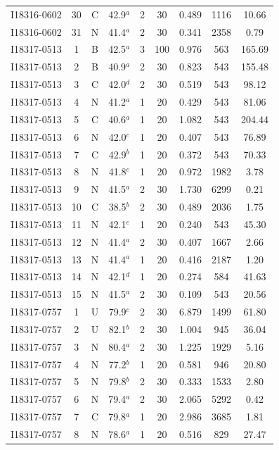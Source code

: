\begin{table}
\begin{tabular}{ccccccccc}
I18316-0602 & 30 & C & 42.9$^{a}$ & 2 & 30 & 0.489 & 1116 & 10.66 \\
I18316-0602 & 31 & N & 41.4$^{a}$ & 2 & 30 & 0.341 & 2358 & 0.79 \\
I18317-0513 & 1 & B & 42.5$^{a}$ & 3 & 100 & 0.976 & 563 & 165.69 \\
I18317-0513 & 2 & B & 40.9$^{a}$ & 2 & 30 & 0.823 & 543 & 155.48 \\
I18317-0513 & 3 & C & 42.0$^{d}$ & 2 & 30 & 0.519 & 543 & 98.12 \\
I18317-0513 & 4 & N & 41.2$^{a}$ & 1 & 20 & 0.429 & 543 & 81.06 \\
I18317-0513 & 5 & C & 40.6$^{a}$ & 1 & 20 & 1.082 & 543 & 204.44 \\
I18317-0513 & 6 & N & 42.0$^{c}$ & 1 & 20 & 0.407 & 543 & 76.89 \\
I18317-0513 & 7 & C & 42.9$^{b}$ & 1 & 20 & 0.372 & 543 & 70.33 \\
I18317-0513 & 8 & N & 41.8$^{c}$ & 1 & 20 & 0.972 & 1982 & 3.78 \\
I18317-0513 & 9 & N & 41.5$^{a}$ & 2 & 30 & 1.730 & 6299 & 0.21 \\
I18317-0513 & 10 & C & 38.5$^{b}$ & 2 & 30 & 0.489 & 2036 & 1.75 \\
I18317-0513 & 11 & N & 42.1$^{e}$ & 1 & 20 & 0.240 & 543 & 45.30 \\
I18317-0513 & 12 & N & 41.4$^{a}$ & 2 & 30 & 0.407 & 1667 & 2.66 \\
I18317-0513 & 13 & N & 41.4$^{a}$ & 1 & 20 & 0.416 & 2187 & 1.20 \\
I18317-0513 & 14 & N & 42.1$^{d}$ & 1 & 20 & 0.274 & 584 & 41.63 \\
I18317-0513 & 15 & N & 41.5$^{a}$ & 2 & 30 & 0.109 & 543 & 20.56 \\
I18317-0757 & 1 & U & 79.9$^{c}$ & 2 & 30 & 6.879 & 1499 & 61.80 \\
I18317-0757 & 2 & U & 82.1$^{b}$ & 2 & 30 & 1.004 & 945 & 36.04 \\
I18317-0757 & 3 & N & 80.4$^{a}$ & 2 & 30 & 1.225 & 1929 & 5.16 \\
I18317-0757 & 4 & N & 77.2$^{b}$ & 1 & 20 & 0.581 & 946 & 20.80 \\
I18317-0757 & 5 & N & 79.8$^{b}$ & 2 & 30 & 0.333 & 1533 & 2.80 \\
I18317-0757 & 6 & N & 79.4$^{a}$ & 2 & 30 & 2.065 & 5292 & 0.42 \\
I18317-0757 & 7 & C & 79.8$^{a}$ & 1 & 20 & 2.986 & 3685 & 1.81 \\
I18317-0757 & 8 & N & 78.6$^{a}$ & 1 & 20 & 0.516 & 829 & 27.47 \\

\end{tabular}
\end{table}
